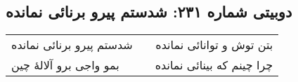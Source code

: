 \begin{center}
\section*{دوبیتی شماره ۲۳۱: شدستم پیرو برنائی نمانده}
\label{sec:231}
\begin{longtable}{l p{0.5cm} r}
شدستم پیرو برنائی نمانده
&&
بتن توش و توانائی نمانده
\\
بمو واجی برو آلالهٔ چین
&&
چرا چینم که بینائی نمانده
\\
\end{longtable}
\end{center}
